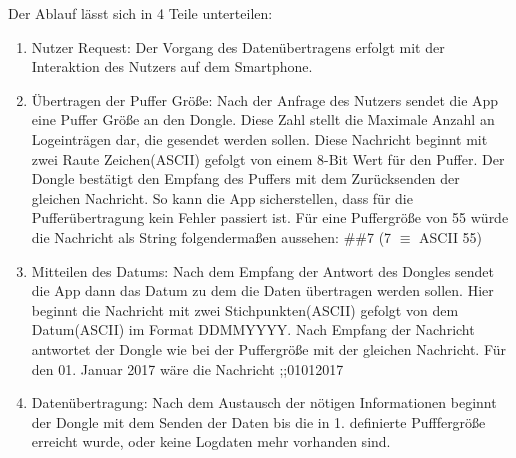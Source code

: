 Der Ablauf lässt sich in 4 Teile unterteilen:
\begin{enumerate}
  \item Nutzer Request: Der Vorgang des Datenübertragens erfolgt mit der Interaktion des Nutzers auf dem Smartphone. 
  \item Übertragen der Puffer Größe: Nach der Anfrage des Nutzers sendet die App eine Puffer Größe an den Dongle. Diese Zahl stellt die Maximale Anzahl an Logeinträgen dar, die gesendet werden sollen. Diese Nachricht beginnt mit zwei Raute Zeichen(ASCII) gefolgt von einem 8-Bit Wert für den Puffer. Der Dongle bestätigt den Empfang des Puffers mit dem Zurücksenden der gleichen Nachricht. So kann die App sicherstellen, dass für die Pufferübertragung kein Fehler passiert ist. Für eine Puffergröße von 55 würde die Nachricht als String folgendermaßen aussehen: \#\#7 (7 $\equiv$ ASCII 55)
  \item  Mitteilen des Datums: Nach dem Empfang der Antwort des Dongles sendet die App dann das Datum zu dem die Daten übertragen werden sollen. Hier beginnt die Nachricht mit zwei Stichpunkten(ASCII) gefolgt von dem Datum(ASCII) im Format DDMMYYYY. Nach Empfang der Nachricht antwortet der Dongle wie bei der Puffergröße mit der gleichen Nachricht. Für den 01. Januar 2017 wäre die Nachricht ;;01012017
  \item Datenübertragung: Nach dem Austausch der nötigen Informationen beginnt der Dongle mit dem Senden der Daten bis die in 1. definierte Pufffergröße erreicht wurde, oder keine Logdaten mehr vorhanden sind.
\end{enumerate}